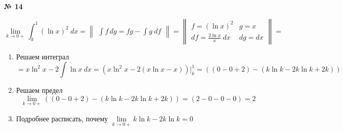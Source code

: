 \documentclass{article}
\begin{document}
\textbf{№ 14} 


$$ \lim\limits_{k \to 0+} \int_{k}^{1} (\ln{x})^2 \ dx 
= \begin{Vmatrix} \int f \,dg = fg - \int g \ df \end{Vmatrix} =
  \begin{Vmatrix} f = (\ln{x})^2 &  g = x \\
                 df = \frac{2\ln{x}}{x} \ dx  & dg = dx \end{Vmatrix} 
= $$

\begin{enumerate}
\item Решаем интеграл
$$ = x\ln^2{x} - 2\int \ln{x} \ dx 
= \left( x\ln^2{x} - 2(x\ln{x}-x) \right) \bigg\vert_{k}^{1} 
= \left( (0-0+2) - (k\ln{k}-2k\ln{k}+2k) \right) $$

\item Решаем предел
$$ \lim\limits_{k \to 0+} \left( (0-0+2) - (k\ln{k}-2k\ln{k}+2k) \right)
= (2 - 0 - 0 - 0)
= 2 $$

\item Подробнее расписать, почему $\lim\limits_{k \to 0+} k\ln{k}-2k\ln{k} = 0 $

\end{enumerate}
\end{document}
